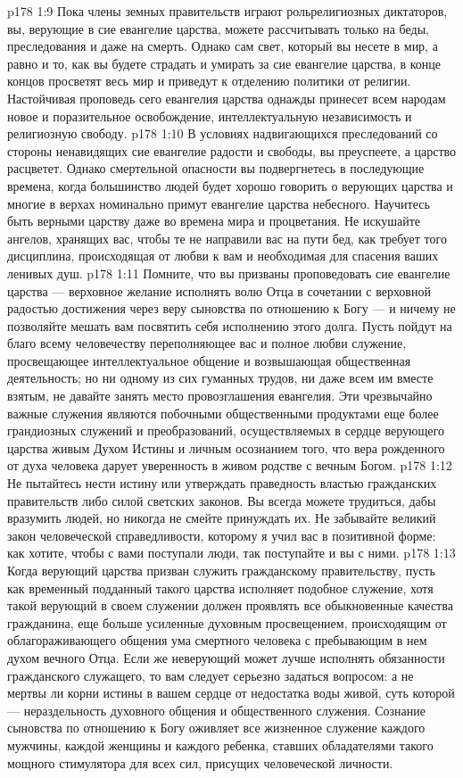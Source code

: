 \vs p178 1:9 Пока члены земных правительств играют рольрелигиозных диктаторов, вы, верующие в сие евангелие царства, можете рассчитывать только на беды, преследования и даже на смерть. Однако сам свет, который вы несете в мир, а равно и то, как вы будете страдать и умирать за сие евангелие царства, в конце концов просветят весь мир и приведут к отделению политики от религии. Настойчивая проповедь сего евангелия царства однажды принесет всем народам новое и поразительное освобождение, интеллектуальную независимость и религиозную свободу.
\vs p178 1:10 В условиях надвигающихся преследований со стороны ненавидящих сие евангелие радости и свободы, вы преуспеете, а царство расцветет. Однако смертельной опасности вы подвергнетесь в последующие времена, когда большинство людей будет хорошо говорить о верующих царства и многие в верхах номинально примут евангелие царства небесного. Научитесь быть верными царству даже во времена мира и процветания. Не искушайте ангелов, хранящих вас, чтобы те не направили вас на пути бед, как требует того дисциплина, происходящая от любви к вам и необходимая для спасения ваших ленивых душ.
\vs p178 1:11 Помните, что вы призваны проповедовать сие евангелие царства --- верховное желание исполнять волю Отца в сочетании с верховной радостью достижения через веру сыновства по отношению к Богу --- и ничему не позволяйте мешать вам посвятить себя исполнению этого долга. Пусть пойдут на благо всему человечеству переполняющее вас и полное любви служение, просвещающее интеллектуальное общение и возвышающая общественная деятельность; но ни одному из сих гуманных трудов, ни даже всем им вместе взятым, не давайте занять место провозглашения евангелия. Эти чрезвычайно важные служения являются побочными общественными продуктами еще более грандиозных служений и преобразований, осуществляемых в сердце верующего царства живым Духом Истины и личным осознанием того, что вера рожденного от духа человека дарует уверенность в живом родстве с вечным Богом.
\vs p178 1:12 Не пытайтесь нести истину или утверждать праведность властью гражданских правительств либо силой светских законов. Вы всегда можете трудиться, дабы вразумить людей, но никогда не смейте принуждать их. Не забывайте великий закон человеческой справедливости, которому я учил вас в позитивной форме: как хотите, чтобы с вами поступали люди, так поступайте и вы с ними.
\vs p178 1:13 Когда верующий царства призван служить гражданскому правительству, пусть как временный подданный такого царства исполняет подобное служение, хотя такой верующий в своем служении должен проявлять все обыкновенные качества гражданина, еще больше усиленные духовным просвещением, происходящим от облагораживающего общения ума смертного человека с пребывающим в нем духом вечного Отца. Если же неверующий может лучше исполнять обязанности гражданского служащего, то вам следует серьезно задаться вопросом: а не мертвы ли корни истины в вашем сердце от недостатка воды живой, суть которой --- нераздельность духовного общения и общественного служения. Сознание сыновства по отношению к Богу оживляет все жизненное служение каждого мужчины, каждой женщины и каждого ребенка, ставших обладателями такого мощного стимулятора для всех сил, присущих человеческой личности.
